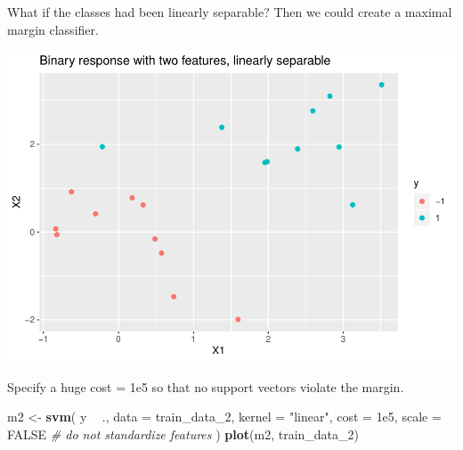 \documentclass[
]{book}
\newenvironment{Shaded}{\begin{snugshade}}{\end{snugshade}}
\newcommand{\CommentTok}[1]{\textcolor[rgb]{0.56,0.35,0.01}{\textit{#1}}}
\newcommand{\DataTypeTok}[1]{\textcolor[rgb]{0.13,0.29,0.53}{#1}}
\newcommand{\DecValTok}[1]{\textcolor[rgb]{0.00,0.00,0.81}{#1}}
\newcommand{\FloatTok}[1]{\textcolor[rgb]{0.00,0.00,0.81}{#1}}
\newcommand{\KeywordTok}[1]{\textcolor[rgb]{0.13,0.29,0.53}{\textbf{#1}}}
\newcommand{\NormalTok}[1]{#1}
\newcommand{\OperatorTok}[1]{\textcolor[rgb]{0.81,0.36,0.00}{\textbf{#1}}}
\newcommand{\OtherTok}[1]{\textcolor[rgb]{0.56,0.35,0.01}{#1}}
\newcommand{\StringTok}[1]{\textcolor[rgb]{0.31,0.60,0.02}{#1}}
\begin{document}
What if the classes had been linearly separable? Then we could create a maximal margin classifier.

\begin{Shaded}
\end{Shaded}

\includegraphics{data-sci_files/figure-latex/unnamed-chunk-105-1.pdf}

Specify a huge cost = 1e5 so that no support vectors violate the margin.

\begin{Shaded}
\begin{Highlighting}[]
\NormalTok{m2 <-}\StringTok{ }\KeywordTok{svm}\NormalTok{(}
\NormalTok{  y }\OperatorTok{~}\StringTok{ }\NormalTok{., }
  \DataTypeTok{data =}\NormalTok{ train_data_}\DecValTok{2}\NormalTok{,}
  \DataTypeTok{kernel =} \StringTok{"linear"}\NormalTok{,}
  \DataTypeTok{cost =} \FloatTok{1e5}\NormalTok{,}
  \DataTypeTok{scale =} \OtherTok{FALSE}  \CommentTok{# do not standardize features}
\NormalTok{)}
\KeywordTok{plot}\NormalTok{(m2, train_data_}\DecValTok{2}\NormalTok{)}
\end{Highlighting}
\end{Shaded}
\end{document}
